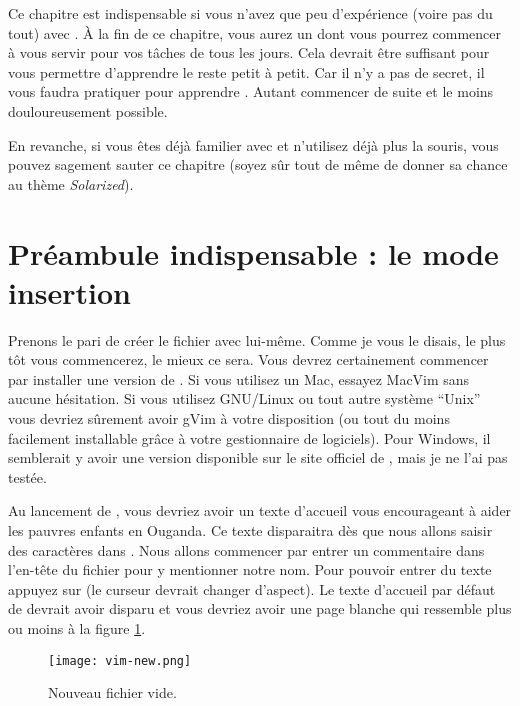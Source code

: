 Ce chapitre est indispensable si vous n'avez que peu d'expérience (voire pas du tout) avec \vim. À la fin de ce chapitre, vous aurez un \vim dont vous pourrez commencer à vous servir pour vos tâches de tous les jours. Cela devrait être suffisant pour vous permettre d'apprendre le reste petit à petit. Car il n'y a pas de secret, il vous faudra pratiquer pour apprendre \vim. Autant commencer de suite et le moins douloureusement possible.

En revanche, si vous êtes déjà familier avec \vim et n'utilisez déjà plus la souris, vous pouvez sagement sauter ce chapitre (soyez sûr tout de même de donner sa chance au thème \emph{Solarized}).

\section{Préambule indispensable : le mode insertion}\label{sec:modeinsertion}

Prenons le pari de créer le fichier \vimrc avec \vim lui-même. Comme je vous le disais, le plus tôt vous commencerez, le mieux ce sera.
Vous devrez certainement commencer par installer une version de \vim. Si vous utilisez un Mac, essayez MacVim  sans aucune hésitation. Si vous utilisez GNU/Linux ou tout autre système ``Unix'' vous devriez sûrement avoir gVim à votre disposition (ou tout du moins facilement installable grâce à votre gestionnaire de logiciels). Pour Windows, il semblerait y avoir une version disponible sur le site officiel de \vim{}, mais je ne l'ai pas testée.

Au lancement de \vim, vous devriez avoir un texte d'accueil vous encourageant à aider les pauvres enfants en Ouganda. Ce texte disparaitra dès que nous allons saisir des caractères dans \vim. Nous allons commencer par entrer un commentaire dans l'en-tête du fichier pour y mentionner notre nom. Pour pouvoir entrer du texte appuyez sur \tti (le curseur devrait changer d'aspect). Le texte d'accueil par défaut de \vim devrait avoir disparu et vous devriez avoir une page blanche qui ressemble plus ou moins à la figure \ref{fig:vim-new}. 

\begin{figure}%
  \texttt{[image: vim-new.png]}
  \caption{Nouveau fichier vide.}
  \label{fig:vim-new}
\end{figure}

